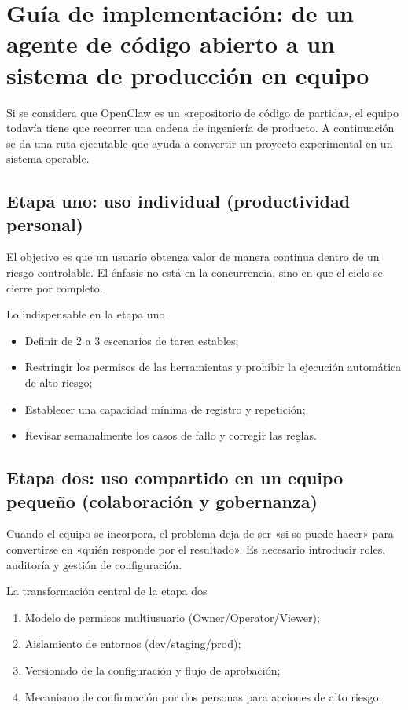 \section{Guía de implementación: de un agente de código abierto a un sistema de producción en equipo}

Si se considera que OpenClaw es un «repositorio de código de partida», el equipo todavía tiene que recorrer una cadena de ingeniería de producto. A continuación se da una ruta ejecutable que ayuda a convertir un proyecto experimental en un sistema operable.

\subsection{Etapa uno: uso individual (productividad personal)}

El objetivo es que un usuario obtenga valor de manera continua dentro de un riesgo controlable. El énfasis no está en la concurrencia, sino en que el ciclo se cierre por completo.

\begin{knowledgebox}{Lo indispensable en la etapa uno}
\begin{itemize}
    \item Definir de 2 a 3 escenarios de tarea estables;
    \item Restringir los permisos de las herramientas y prohibir la ejecución automática de alto riesgo;
    \item Establecer una capacidad mínima de registro y repetición;
    \item Revisar semanalmente los casos de fallo y corregir las reglas.
\end{itemize}
\end{knowledgebox}

\subsection{Etapa dos: uso compartido en un equipo pequeño (colaboración y gobernanza)}

Cuando el equipo se incorpora, el problema deja de ser «si se puede hacer» para convertirse en «quién responde por el resultado». Es necesario introducir roles, auditoría y gestión de configuración.

\begin{importantbox}{La transformación central de la etapa dos}
\begin{enumerate}
    \item Modelo de permisos multiusuario (Owner/Operator/Viewer);
    \item Aislamiento de entornos (dev/staging/prod);
    \item Versionado de la configuración y flujo de aprobación;
    \item Mecanismo de confirmación por dos personas para acciones de alto riesgo.
\end{enumerate}
\end{importantbox}

